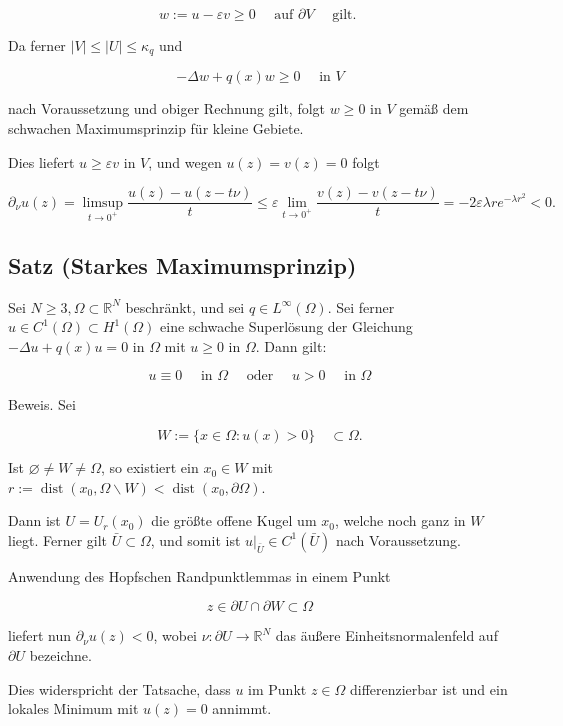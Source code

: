 \documentclass[10pt, letterpaper]{article}
\begin{document}
$$
w:=u-\varepsilon v \geq 0 \quad \text { auf } \partial V \quad \text { gilt. }
$$

Da ferner $|V| \leq|U| \leq \kappa_{q}$ und

$$
-\Delta w+q(x) w \geq 0 \quad \text { in } V
$$

nach Voraussetzung und obiger Rechnung gilt, folgt $w \geq 0$ in $V$ gemäß dem schwachen Maximumsprinzip für kleine Gebiete.

Dies liefert $u \geq \varepsilon v$ in $V$, und wegen $u(z)=v(z)=0$ folgt

$$
\partial_{\nu} u(z)=\limsup _{t \rightarrow 0^{+}} \frac{u(z)-u(z-t \nu)}{t} \leq \varepsilon \lim _{t \rightarrow 0^{+}} \frac{v(z)-v(z-t \nu)}{t}=-2 \varepsilon \lambda r e^{-\lambda r^{2}}<0 .
$$

\subsection*{Satz (Starkes Maximumsprinzip)}

Sei $N \geq 3, \Omega \subset \mathbb{R}^{N}$ beschränkt, und sei $q \in L^{\infty}(\Omega)$. Sei ferner $u \in C^{1}(\Omega) \subset H^{1}(\Omega)$ eine schwache Superlösung der Gleichung $-\Delta u+q(x) u=0$ in $\Omega$ mit $u \geq 0$ in $\Omega$. Dann gilt:

$$
u \equiv 0 \quad \text { in } \Omega \quad \text { oder } \quad u>0 \quad \text { in } \Omega
$$

Beweis. Sei

$$
W:=\{x \in \Omega: u(x)>0\} \quad \subset \Omega .
$$

Ist $\varnothing \neq W \neq \Omega$, so existiert ein $x_{0} \in W$ mit $r:=\operatorname{dist}\left(x_{0}, \Omega \backslash W\right)<\operatorname{dist}\left(x_{0}, \partial \Omega\right)$.

Dann ist $U=U_{r}\left(x_{0}\right)$ die größte offene Kugel um $x_{0}$, welche noch ganz in $W$ liegt. Ferner gilt $\bar{U} \subset \Omega$, und somit ist $\left.u\right|_{\bar{U}} \in C^{1}(\bar{U})$ nach Voraussetzung.

Anwendung des Hopfschen Randpunktlemmas in einem Punkt

$$
z \in \partial U \cap \partial W \subset \Omega
$$

liefert nun $\partial_{\nu} u(z)<0$, wobei $\nu: \partial U \rightarrow \mathbb{R}^{N}$ das äußere Einheitsnormalenfeld auf $\partial U$ bezeichne.

Dies widerspricht der Tatsache, dass $u$ im Punkt $z \in \Omega$ differenzierbar ist und ein lokales Minimum mit $u(z)=0$ annimmt.
\end{document}
